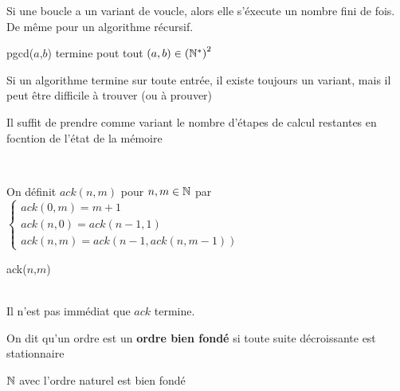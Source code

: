 \begin{proposition}
	\label{1-1}
	Si une boucle a un variant de voucle, alors elle s'éxecute un nombre fini de fois. De même pour un algorithme récursif.
\end{proposition}

\begin{example}
	pgcd($a$,$b$) termine pout tout $(a,b)\in \left(\mathbb{N}^*\right)^2$
\end{example}

\begin{rem}
	Si un algorithme termine sur toute entrée, il existe toujours un variant, mais il peut être difficile à trouver (ou à prouver)
\end{rem}

\begin{com}
	Il suffit de prendre comme variant le nombre d'étapes de calcul restantes en focntion de l'état de la mémoire
\end{com}

\begin{example} \enspace \\
	\begin{minipage}{0.4\linewidth}
		On définit $ack(n,m)$ pour $n,m\in \mathbb{N}$ par \\ $\left\{\begin{array}{l}
			ack(0,m) = m+1\\
			ack(n, 0) = ack(n-1, 1)\\
			ack(n,m) = ack(n-1, ack(n, m-1))
		\end{array}\right.$
	\end{minipage}\quad
	\begin{minipage}{0.55\linewidth}
		\begin{algorithm}[H]
			\caption{ack($n$,$m$)}
		\end{algorithm}
	\end{minipage} \\Il n'est pas immédiat que $ack$ termine.
\end{example}

\begin{definition}
	On dit qu'un ordre est un \textbf{ordre bien fondé} si toute suite décroissante est stationnaire
\end{definition}

\begin{example}
	$\mathbb{N}$ avec l'ordre naturel est bien fondé 
\end{example}

